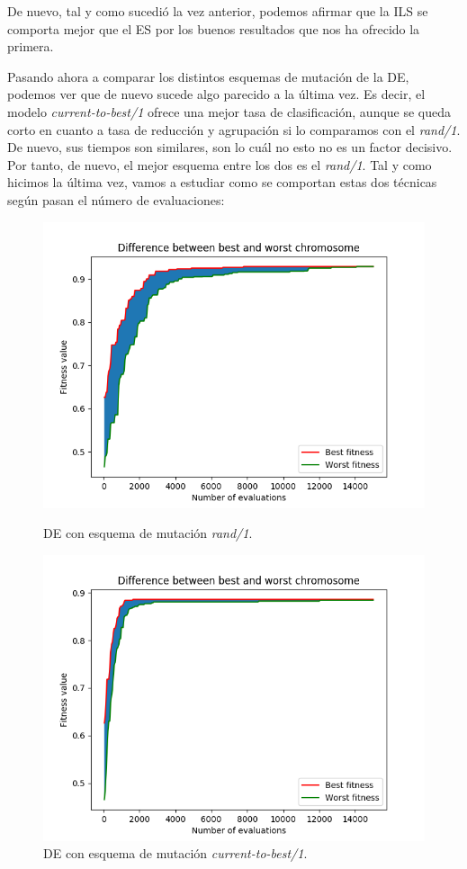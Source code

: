 \documentclass[11pt,a4paper]{article}
\begin{document}
De nuevo, tal y como sucedió la vez anterior, podemos afirmar que la ILS se comporta mejor que el ES por los buenos resultados que
nos ha ofrecido la primera.

Pasando ahora a comparar los distintos esquemas de mutación de la DE, podemos ver que de nuevo sucede algo parecido a la última
vez. Es decir, el modelo \textit{current-to-best/1} ofrece una mejor tasa de clasificación, aunque se queda corto en cuanto
a tasa de reducción y agrupación si lo comparamos con el \textit{rand/1}. De nuevo, sus tiempos son similares, son lo cuál no esto
no es un factor decisivo. Por tanto, de nuevo, el mejor esquema entre los dos es el \textit{rand/1}. Tal y como hicimos la última
vez, vamos a estudiar como se comportan estas dos técnicas según pasan el número de evaluaciones:

\begin{figure}[H]
\centering
\begin{minipage}{.5\textwidth}
	\centering
	\includegraphics[scale=0.4]{img/ionosphere-de-rand.png}
	\caption{DE con esquema de mutación \textit{rand/1}.}
\end{minipage}%
\begin{minipage}{.5\textwidth}
	\centering
	\includegraphics[scale=0.4]{img/ionosphere-de-best.png}
	\caption{DE con esquema de mutación \textit{current-to-best/1}.}
\end{minipage}
\end{figure}
\end{document}
